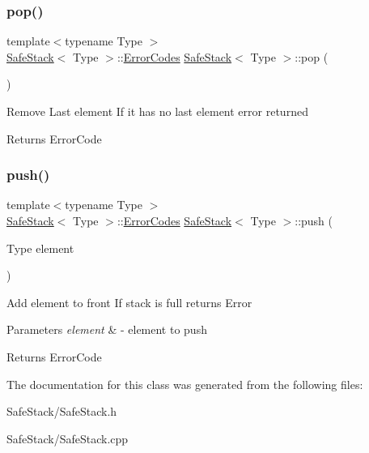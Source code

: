 \subsubsection{\texorpdfstring{pop()}{pop()}}
{\footnotesize\ttfamily template$<$typename Type $>$ \\
\hyperlink{classSafeStack}{Safe\+Stack}$<$ Type $>$\+::\hyperlink{classSafeStack_a3a6ee072918bd0a2c09fa0ea12c1ab64}{Error\+Codes} \hyperlink{classSafeStack}{Safe\+Stack}$<$ Type $>$\+::pop (\begin{DoxyParamCaption}{ }\end{DoxyParamCaption})}

Remove Last element If it has no last element error returned \begin{DoxyReturn}{Returns}
Error\+Code 
\end{DoxyReturn}
\mbox{\label{classSafeStack_a4ecd17feae41fe142535f281a80a6a6c}} 
\subsubsection{\texorpdfstring{push()}{push()}}
{\footnotesize\ttfamily template$<$typename Type $>$ \\
\hyperlink{classSafeStack}{Safe\+Stack}$<$ Type $>$\+::\hyperlink{classSafeStack_a3a6ee072918bd0a2c09fa0ea12c1ab64}{Error\+Codes} \hyperlink{classSafeStack}{Safe\+Stack}$<$ Type $>$\+::push (\begin{DoxyParamCaption}\item[{Type}]{element }\end{DoxyParamCaption})}

Add element to front If stack is full returns Error 
\begin{DoxyParams}{Parameters}
{\em element} & -\/ element to push \\
\hline
\end{DoxyParams}
\begin{DoxyReturn}{Returns}
Error\+Code 
\end{DoxyReturn}


The documentation for this class was generated from the following files\+:\begin{DoxyCompactItemize}
\item 
Safe\+Stack/Safe\+Stack.\+h\item 
Safe\+Stack/Safe\+Stack.\+cpp\end{DoxyCompactItemize}
